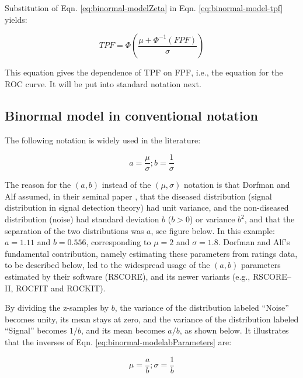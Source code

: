 \documentclass[
]{book}
\begin{document}
Substitution of Eqn. \eqref{eq:binormal-modelZeta} in Eqn. \eqref{eq:binormal-model-tpf} yields:

\begin{equation} 
TPF = \Phi\left ( \frac{\mu + \Phi^{-1}\left (FPF  \right )}{\sigma} \right )
\label{eq:binormal-model-roc-curve1}
\end{equation}

This equation gives the dependence of TPF on FPF, i.e., the equation for the ROC curve. It will be put into standard notation next.

\hypertarget{binormal-model-in-conventional-notation}{%
\subsection{Binormal model in conventional notation}\label{binormal-model-in-conventional-notation}}

The following notation is widely used in the literature:

\begin{equation} 
a=\frac{\mu}{\sigma};b=\frac{1}{\sigma}
\label{eq:binormal-modelabParameters}
\end{equation}

The reason for the \((a,b)\) instead of the \((\mu,\sigma)\) notation is that Dorfman and Alf assumed, in their seminal paper \citep{RN1081}, that the diseased distribution (signal distribution in signal detection theory) had unit variance, and the non-diseased distribution (noise) had standard deviation \(b\) (\(b > 0\)) or variance \(b^2\), and that the separation of the two distributions was \(a\), see figure below. In this example: \(a = 1.11\) and \(b = 0.556\), corresponding to \(\mu = 2\) and \(\sigma = 1.8\). Dorfman and Alf's fundamental contribution, namely estimating these parameters from ratings data, to be described below, led to the widespread usage of the \((a,b)\) parameters estimated by their software (RSCORE), and its newer variants (e.g., RSCORE--II, ROCFIT and ROCKIT).

By dividing the z-samples by \(b\), the variance of the distribution labeled ``Noise'' becomes unity, its mean stays at zero, and the variance of the distribution labeled ``Signal'' becomes \(1/b\), and its mean becomes \(a/b\), as shown below. It illustrates that the inverses of Eqn. \eqref{eq:binormal-modelabParameters} are:

\begin{equation} 
\mu=\frac{a}{b};\sigma=\frac{1}{b}
\label{eq:binormal-modelabParametersInv}
\end{equation}
\end{document}
